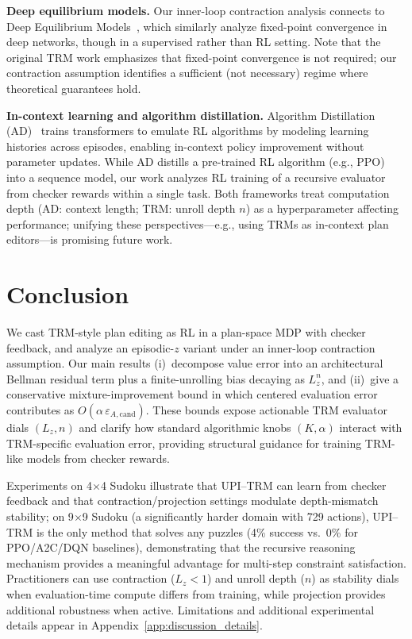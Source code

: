 \documentclass{article}
\theoremstyle{plain}
\theoremstyle{definition}
\theoremstyle{remark}
\newcommand{\shortonly}[1]{#1}
\newcommand{\shortonly}[1]{}
\begin{document}
{\textbf{Deep equilibrium models.}
Our inner-loop contraction analysis connects to Deep Equilibrium Models~\citep{Bai2019DEQ}, which similarly analyze fixed-point convergence in deep networks, though in a supervised rather than RL setting. Note that the original TRM work emphasizes that fixed-point convergence is not required; our contraction assumption identifies a sufficient (not necessary) regime where theoretical guarantees hold.

\textbf{In-context learning and algorithm distillation.} Algorithm Distillation (AD)~\citep{laskin2022context} trains transformers to emulate RL algorithms by modeling learning histories across episodes, enabling in-context policy improvement without parameter updates. While AD distills a pre-trained RL algorithm (e.g., PPO) into a sequence model, our work analyzes RL training of a recursive evaluator from checker rewards within a single task. Both frameworks treat computation depth (AD: context length; TRM: unroll depth $n$) as a hyperparameter affecting performance; unifying these perspectives---e.g., using TRMs as in-context plan editors---is promising future work.}

\section{Conclusion}
\label{sec:conclusion}

We cast TRM-style plan editing as RL in a plan-space MDP with checker feedback, and analyze an episodic-$z$ variant under an inner-loop contraction assumption.
Our main results (i)~decompose value error into an architectural Bellman residual term plus a finite-unrolling bias decaying as $L_z^n$, and (ii)~give a conservative mixture-improvement bound in which centered evaluation error contributes as $O(\alpha\,\varepsilon_{A,\mathrm{cand}})$.
These bounds expose actionable TRM evaluator dials $(L_z,n)$ and clarify how standard algorithmic knobs $(K,\alpha)$ interact with TRM-specific evaluation error, providing structural guidance for training TRM-like models from checker rewards.

Experiments on 4$\times$4 Sudoku illustrate that UPI--TRM can learn from checker feedback and that contraction/projection settings modulate depth-mismatch stability; on 9$\times$9 Sudoku (a significantly harder domain with 729 actions), UPI--TRM is the only method that solves any puzzles (4\% success vs.\ 0\% for PPO/A2C/DQN baselines), demonstrating that the recursive reasoning mechanism provides a meaningful advantage for multi-step constraint satisfaction.
Practitioners can use contraction ($L_z < 1$) and unroll depth ($n$) as stability dials when evaluation-time compute differs from training, while projection provides additional robustness when active.
\shortonly{Limitations and additional experimental details appear in Appendix~\ref{app:discussion_details}.}
\end{document}
